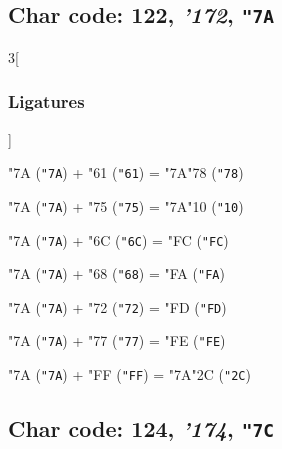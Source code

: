 \documentclass{article}
\newlength{\maxcharwidth}
\begin{document}
\subsection{Char code: 122, {\it'172}, {\tt"7A}}
\label{char_122}


\begin{multicols}{3}[\subsubsection{Ligatures}]

{\testfont\char"7A\noboundary} ({\tt"7A}) + {\testfont\char"61\noboundary} ({\tt"61}) = {\testfont\char"7A\noboundary}{\testfont\char"78\noboundary} ({\tt"78}) 

{\testfont\char"7A\noboundary} ({\tt"7A}) + {\testfont\char"75\noboundary} ({\tt"75}) = {\testfont\char"7A\noboundary}{\testfont\char"10\noboundary} ({\tt"10}) 

{\testfont\char"7A\noboundary} ({\tt"7A}) + {\testfont\char"6C\noboundary} ({\tt"6C}) = {\testfont\char"FC\noboundary} ({\tt"FC}) 

{\testfont\char"7A\noboundary} ({\tt"7A}) + {\testfont\char"68\noboundary} ({\tt"68}) = {\testfont\char"FA\noboundary} ({\tt"FA}) 

{\testfont\char"7A\noboundary} ({\tt"7A}) + {\testfont\char"72\noboundary} ({\tt"72}) = {\testfont\char"FD\noboundary} ({\tt"FD}) 

{\testfont\char"7A\noboundary} ({\tt"7A}) + {\testfont\char"77\noboundary} ({\tt"77}) = {\testfont\char"FE\noboundary} ({\tt"FE}) 

{\testfont\char"7A\noboundary} ({\tt"7A}) + {\testfont\char"FF\noboundary} ({\tt"FF}) = {\testfont\char"7A\noboundary}{\testfont\char"2C\noboundary} ({\tt"2C}) 

\end{multicols}

\subsection{Char code: 124, {\it'174}, {\tt"7C}}
\label{char_124}
\end{document}
